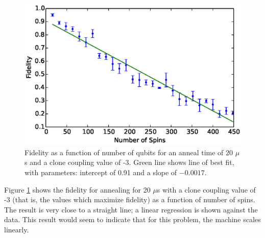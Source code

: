 \begin{figure}
	\includegraphics{img/trend.eps}
	\caption[Fidelity vs Number of Qubits]{Fidelity as a function of number of qubits for an anneal time of 20 $\mu$s and a clone coupling value of -3.  Green line shows line of best fit, with parameters: intercept of 0.91 and a slope of $-0.0017$.}
	\label{fig:trend}
\end{figure}

Figure \ref{fig:trend} shows the fidelity for annealing for 20 $\mu$s with a clone coupling value of -3 (that is, the values which maximize fidelity) as a function of number of spins.  The result is very close to a straight line; a linear regression is shown against the data.  This result would seem to indicate that for this problem, the \machine machine scales linearly.
